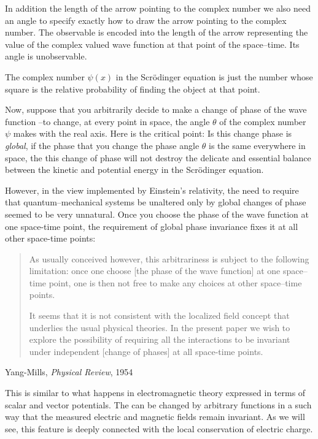 In addition the length of the arrow pointing to the complex number we also need an angle to specify exactly how to draw the arrow pointing to the complex number. The observable is encoded into the length of the arrow representing the value of the complex valued wave function at that point of the space--time. Its angle is unobservable.

The complex number $\psi(x)$ in the Scrödinger equation is just the number whose square is the relative probability of finding the object at that point.

Now, suppose that you arbitrarily decide to make a change of phase of the wave function --to change, at every point in space, the angle $\theta$ of the complex number $\psi$ makes with the real axis. Here is the critical point: Is this change phase is \emph{global}, if the phase that you change the phase angle $\theta$ is the same everywhere in space, the this change of phase will not destroy the delicate and essential balance between the kinetic and potential energy in the Scrödinger equation.

However, in the view implemented by Einstein's relativity, the need to require that quantum--mechanical systems be unaltered only by global changes of phase seemed to be very unnatural. Once you choose the phase of the wave function at one space-time point, the requirement of global phase invariance fixes it at all other space-time points:


  \begin{quote}
\small
    As usually conceived however, this arbitrariness is subject to the following  limitation: once one choose [the phase of the wave function] at one space--time point, one is then not free to make any choices at other space--time points.

It seems that it is not consistent with the localized field concept that underlies the usual physical theories. In the present paper we wish to explore the possibility of requiring all the interactions to be invariant under independent [change of phases] at all space-time points.
  \end{quote}
  \begin{flushright}
    Yang-Mills, \emph{Physical Review}, 1954
  \end{flushright}

This is similar to what happens in electromagnetic theory expressed in terms of scalar and vector potentials. The can be changed by arbitrary functions in a such way that the measured electric and magnetic fields remain invariant. As we will see, this feature is deeply connected with the local conservation of electric charge. 

